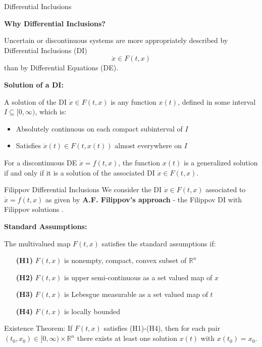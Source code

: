 \begin{frame}{Differential Inclusions}

	\textbf{Why Differential Inclusions?}

	Uncertain or discontinuous systems are more appropriately described by Differential Inclusions (DI)
	$$\dot{x} \in F(t,x)$$
	than by Differential Equations (DE).

	\vspace{0.5cm}
	\textbf{Solution of a DI:}

	A solution of the DI $\dot{x} \in F(t,x)$ is any function $x(t)$, defined in some interval $I \subseteq [0,\infty)$, which is:
	\begin{itemize}
		\item Absolutely continuous on each compact subinterval of $I$
		\item Satisfies $\dot{x}(t) \in F(t,x(t))$ almost everywhere on $I$
	\end{itemize}

	For a discontinuous DE $\dot{x} = f(t,x)$, the function $x(t)$ is a \alert{generalized solution} if and only if it is a solution of the associated DI $\dot{x} \in F(t,x)$.

\end{frame}

\begin{frame}{Filippov Differential Inclusions}
  \small
	We consider the DI $\dot{x} \in F(t,x)$ associated to $\dot{x} = f(t,x)$ as given by \textbf{A.F. Filippov's approach} - the \alert{Filippov DI} with \alert{Filippov solutions} \cite{Filippov1988}.

	\vspace{0.5cm}
	\textbf{Standard Assumptions:}

	The multivalued map $F(t,x)$ satisfies the standard assumptions if:

	\begin{itemize}
		\item[\textbf{(H1)}] $F(t,x)$ is nonempty, compact, convex subset of $\mathbb{R}^n$
		\item[\textbf{(H2)}] $F(t,x)$ is upper semi-continuous as a set valued map of $x$
		\item[\textbf{(H3)}] $F(t,x)$ is Lebesgue measurable as a set valued map of $t$
		\item[\textbf{(H4)}] $F(t,x)$ is locally bounded
	\end{itemize}

	\vspace{0.3cm}
	\alert{Existence Theorem:} If $F(t,x)$ satisfies (H1)-(H4), then for each pair $(t_0,x_0) \in [0,\infty) \times \mathbb{R}^n$ there exists at least one solution $x(t)$ with $x(t_0) = x_0$.
\end{frame}

